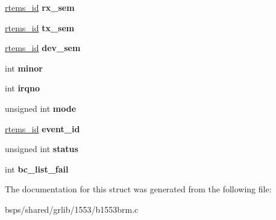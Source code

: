 \begin{DoxyCompactItemize}
\item 
\mbox{\label{structbrm__priv_abc5f578da0bb571921bfdd5657c27a6e}} 
\mbox{\hyperlink{group__ClassicTasks_gab20892b814dced7dd4e5b9bf42becd57}{rtems\+\_\+id}} {\bfseries rx\+\_\+sem}
\item 
\mbox{\label{structbrm__priv_af2284330adf70d46884391525b95c54b}} 
\mbox{\hyperlink{group__ClassicTasks_gab20892b814dced7dd4e5b9bf42becd57}{rtems\+\_\+id}} {\bfseries tx\+\_\+sem}
\item 
\mbox{\label{structbrm__priv_a62912acb12a274a00d9fb3d90931f7a3}} 
\mbox{\hyperlink{group__ClassicTasks_gab20892b814dced7dd4e5b9bf42becd57}{rtems\+\_\+id}} {\bfseries dev\+\_\+sem}
\item 
\mbox{\label{structbrm__priv_a1f0f758e81039eb63e2bd38ed03a8c3a}} 
int {\bfseries minor}
\item 
\mbox{\label{structbrm__priv_ae9f5a0632c0206e64822e9d7b5920ca5}} 
int {\bfseries irqno}
\item 
\mbox{\label{structbrm__priv_a682ae17acb8c873bf041e56fef1134f3}} 
unsigned int {\bfseries mode}
\item 
\mbox{\label{structbrm__priv_a941d63e4d4975b5b921d80a3d7ba9b8f}} 
\mbox{\hyperlink{group__ClassicTasks_gab20892b814dced7dd4e5b9bf42becd57}{rtems\+\_\+id}} {\bfseries event\+\_\+id}
\item 
\mbox{\label{structbrm__priv_afd3cbb95289ac1c491df33368821ff4b}} 
unsigned int {\bfseries status}
\item 
\mbox{\label{structbrm__priv_a21bb581981fc592ee94d170a0c25ffcb}} 
int {\bfseries bc\+\_\+list\+\_\+fail}
\end{DoxyCompactItemize}


The documentation for this struct was generated from the following file\+:\begin{DoxyCompactItemize}
\item 
bsps/shared/grlib/1553/b1553brm.\+c\end{DoxyCompactItemize}

